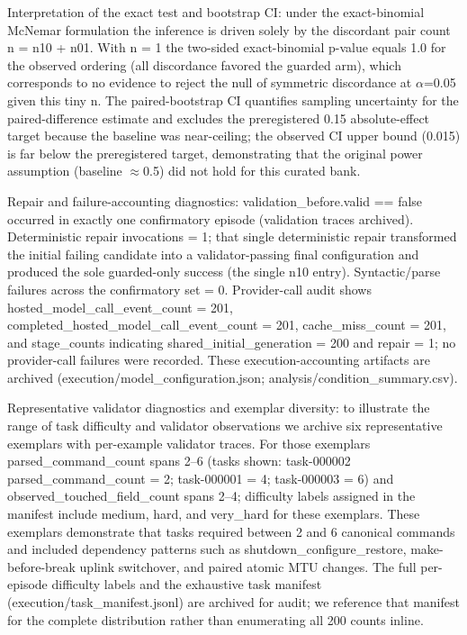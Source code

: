 \documentclass[conference]{IEEEtran}
\begin{document}
Interpretation of the exact test and bootstrap CI: under the exact-binomial McNemar formulation the inference is driven solely by the discordant pair count n = n10 + n01. With n = 1 the two-sided exact-binomial p-value equals 1.0 for the observed ordering (all discordance favored the guarded arm), which corresponds to no evidence to reject the null of symmetric discordance at \ensuremath{\alpha}=0.05 given this tiny n. The paired-bootstrap CI quantifies sampling uncertainty for the paired-difference estimate and excludes the preregistered 0.15 absolute-effect target because the baseline was near-ceiling; the observed CI upper bound (0.015) is far below the preregistered target, demonstrating that the original power assumption (baseline \ensuremath{\approx}0.5) did not hold for this curated bank.

Repair and failure-accounting diagnostics: validation\_before.valid == false occurred in exactly one confirmatory episode (validation traces archived). Deterministic repair invocations = 1; that single deterministic repair transformed the initial failing candidate into a validator-passing final configuration and produced the sole guarded-only success (the single n10 entry). Syntactic/parse failures across the confirmatory set = 0. Provider-call audit shows hosted\_model\_call\_event\_count = 201, completed\_hosted\_model\_call\_event\_count = 201, cache\_miss\_count = 201, and stage\_counts indicating shared\_initial\_generation = 200 and repair = 1; no provider-call failures were recorded. These execution-accounting artifacts are archived (execution/model\_configuration.json; analysis/condition\_summary.csv).

Representative validator diagnostics and exemplar diversity: to illustrate the range of task difficulty and validator observations we archive six representative exemplars with per-example validator traces. For those exemplars parsed\_command\_count spans 2--6 (tasks shown: task-000002 parsed\_command\_count = 2; task-000001 = 4; task-000003 = 6) and observed\_touched\_field\_count spans 2--4; difficulty labels assigned in the manifest include medium, hard, and very\_hard for these exemplars. These exemplars demonstrate that tasks required between 2 and 6 canonical commands and included dependency patterns such as shutdown\_configure\_restore, make-before-break uplink switchover, and paired atomic MTU changes. The full per-episode difficulty labels and the exhaustive task manifest (execution/task\_manifest.jsonl) are archived for audit; we reference that manifest for the complete distribution rather than enumerating all 200 counts inline.
\end{document}
